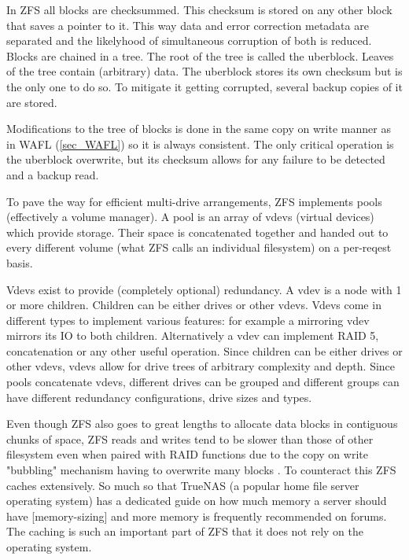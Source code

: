            In ZFS all blocks are checksummed. This checksum is stored on any
            other block that saves a pointer to it. This way data and error
            correction metadata are separated and the likelyhood of
            simultaneous corruption of both is reduced. Blocks are chained in a
            tree. The root of the tree is called the uberblock. Leaves of the
            tree contain (arbitrary) data. The uberblock stores its own
            checksum but is the only one to do so. To mitigate it getting
            corrupted, several backup copies of it are stored.

            Modifications to the tree of blocks is done in the same copy on
            write manner as in WAFL (\ref{sec_WAFL}) so it is always
            consistent.  The only critical operation is the uberblock
            overwrite, but its checksum allows for any failure to be detected
            and a backup read.

            To pave the way for efficient multi-drive arrangements, ZFS
            implements pools (effectively a volume manager). A pool is an array
            of vdevs (virtual devices) which provide storage. Their space is
            concatenated together and handed out to every different volume
            (what ZFS calls an individual filesystem) on a per-reqest basis.

            Vdevs exist to provide (completely optional) redundancy. A vdev is
            a node with 1 or more children. Children can be either drives or
            other vdevs. Vdevs come in different types to implement various
            features: for example a mirroring vdev mirrors its IO to both
            children. Alternatively a vdev can implement RAID 5, concatenation
            or any other useful operation. Since children can be either drives
            or other vdevs, vdevs allow for drive trees of arbitrary complexity
            and depth. Since pools concatenate vdevs, different drives can be
            grouped and different groups can have different redundancy
            configurations, drive sizes and types.

            Even though ZFS also goes to great lengths to allocate data blocks
            in contiguous chunks of space, ZFS reads and writes tend to be
            slower than those of other filesystem even when paired with RAID
            functions due to the copy on write "bubbling" mechanism having to
            overwrite many blocks \cite{ZFS} \cite{WAFL}. To counteract this
            ZFS caches extensively. So much so that TrueNAS (a popular home
            file server operating system) has a dedicated guide on how much
            memory a server should have
            \cite{TrueNAS_hardware_guide}[memory-sizing] and more memory is
            frequently recommended on forums. The caching is such an important
            part of ZFS that it does not rely on the operating system.

